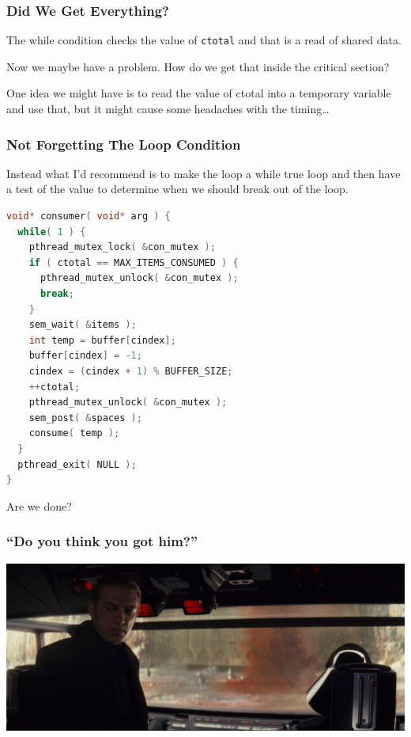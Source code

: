 \begin{frame}
\frametitle{Did We Get Everything?}

The while condition checks the value of \texttt{ctotal} and that is a read of shared data. 

Now we maybe have a problem. How do we get that inside the critical section?

One idea we might have is to read the value of ctotal into a temporary variable and use that, but it might cause some headaches with the timing\ldots


\end{frame}

\begin{frame}[fragile]
\frametitle{Not Forgetting The Loop Condition}

 Instead what I'd recommend is to make the loop a while true loop and then have a test of the value to determine when we should break out of the loop.
 
 \begin{lstlisting}[language=C]
void* consumer( void* arg ) { 
  while( 1 ) { 
    pthread_mutex_lock( &con_mutex );  
    if ( ctotal == MAX_ITEMS_CONSUMED ) {
      pthread_mutex_unlock( &con_mutex );
      break;
    }   
    sem_wait( &items );
    int temp = buffer[cindex];
    buffer[cindex] = -1; 
    cindex = (cindex + 1) % BUFFER_SIZE;
    ++ctotal;
    pthread_mutex_unlock( &con_mutex );
    sem_post( &spaces );
    consume( temp );
  }
  pthread_exit( NULL );
}
\end{lstlisting}

Are we done?

\end{frame}


\begin{frame}
\frametitle{``Do you think you got him?''}

\begin{center}
	\includegraphics[width=\textwidth]{images/gothim.png}
\end{center}

\end{frame}



